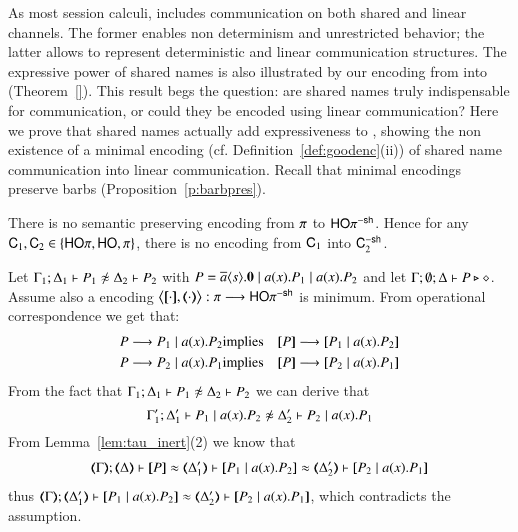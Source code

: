 \noi As most session calculi, 
\HOp includes communication on both shared and linear channels.
The former enables non determinism and unrestricted behavior; the latter allows to represent
deterministic and linear communication structures.
The expressive power of shared names is also illustrated by our 
encoding from \HOp into \sessp (Theorem~\ref{}).
This result begs the question: are shared names truly indispensable for communication, or could they
be encoded using linear communication?
Here we prove that shared names actually add expressiveness to \HOp,
showing 
the non existence of a minimal encoding 
(cf. Definition~\ref{def:goodenc}(ii))
of shared name communication into linear 
communication. 
Recall that minimal encodings preserve barbs (Proposition~\ref{p:barbpres}).

\begin{theorem}\rm
There is no semantic preserving encoding 
from $\pi$ to $\mathsf{HO}\pi^{\mathsf{-sh}}$. Hence 
for any $\mathsf{C}_1,\mathsf{C}_2\in \{ \mathsf{HO}\pi, \mathsf{HO}, \pi\}$, 
there is no encoding from $\mathsf{C}_1$ into $\mathsf{C}_2^{-\mathsf{sh}}$.  
\end{theorem}
\begin{IEEEproof}[Proof]
	Let $\horel{\Gamma_1}{\Delta_1}{P_1}{\not\wb}{\Delta_2}{P_2}$
	with $P = \overline{a} \langle s \rangle . \mathbf{0} \;|\; a (x) . P_1 \;|\; a (x) . P_2$ and	let $\Gamma; \emptyset; \Delta \vdash P \triangleright \diamond$.
	Assume also a encoding
	$\enc{\cdot}{\cdot}: \sessp \longrightarrow \HOp^{\minussh}$
is minimum. 
	From operational correspondence we get that:
	\begin{eqnarray*}
		P \red P_1 \Par \bacc{a}{x} P_2 &\textrm{implies}& \map{P} \red \map{P_1 \Par \bacc{a}{x} P_2}\\
		P \red P_2 \Par \bacc{a}{x} P_1 &\textrm{implies}& \map{P} \red \map{P_2 \Par \bacc{a}{x} P_1}
	\end{eqnarray*}
	From the fact that
	$\horel{\Gamma_1}{\Delta_1}{P_1}{\not\wb}{\Delta_2}{P_2}$
	we can derive that
%
	\[
		\horel{\Gamma_1'}{\Delta_1'}{P_1 \Par \bacc{a}{x} P_2}{\not\wb}{\Delta_2'}{P_2 \Par \bacc{a}{x} P_1}
	\]
%
	From Lemma~\ref{lem:tau_inert}(2) we know that
%
	\begin{eqnarray*}
		\horel{\mapt{\Gamma}}{\mapt{\Delta}}{\map{P}}{\wb}{\mapt{\Delta_1'}}{\map{P_1 \Par \bacc{a}{x} P_2}}\wb 
{\mapt{\Delta_2'}}\proves {\map{P_2 \Par \bacc{a}{x} P_1}}
	\end{eqnarray*}
%
	\noi thus
$\horel{\mapt{\Gamma}}{\mapt{\Delta_1'}}{\map{P_1 \Par \bacc{a}{x} P_2}}{\wb}{\mapt{\Delta_2'}}{\map{P_2 \Par \bacc{a}{x} P_1}}$, 
%
	which contradicts the assumption. 
\end{IEEEproof}


